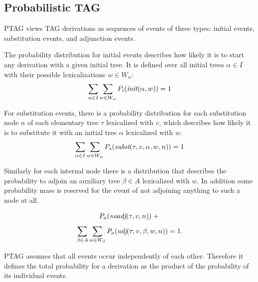 \subsection{Probabilistic TAG}
\label{ssec:probmodels}
PTAG \cite{resnik1992} views TAG derivations as sequences of events of three types: initial events, substitution events, and adjunction events.

The probability distribution for initial events describes how likely it is to start any derivation with a given initial tree. 
It is defined over all initial trees $\alpha \in I$ with their possible lexicalizations $w \in W_\alpha$: 
$$ \sum\limits_{\alpha \in I}\sum\limits_{w \in W_\alpha} P_i(\textit{init}(\alpha, w)) = 1 $$

For substitution events, there is a probability distribution for each substitution node $n$ of each elementary tree $\tau$ lexicalized with $v$, which describes how likely it is to substitute it with an initial tree $\alpha$ lexicalized with $w$. 
$$\sum\limits_{\alpha \in I}\sum\limits_{w \in W_\alpha} P_s(\textit{subst}(\tau,v , \alpha, w, n)) = 1$$

Similarly for each internal node there is a distribution that describes the probability to adjoin an auxiliary tree $\beta \in A$ lexicalized with $w$. In addition some probability mass is reserved for the event of not adjoining anything to such a node at all.

$$ P_a(\textit{noadj}(\tau, v, n)) + \strut$$
$$ \sum\limits_{\beta \in A}\sum\limits_{w \in W_\beta} P_a(\textit{adj}(\tau, v, \beta, w, n)) = 1.$$

PTAG assumes that all events occur independently of each other. Therefore it defines the total probability for a derivation as the product of the probability of its individual events. 

